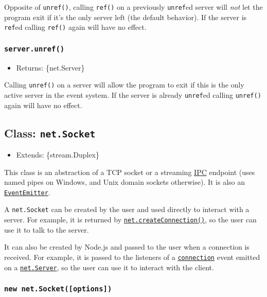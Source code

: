 Opposite of \texttt{unref()}, calling \texttt{ref()} on a previously
\texttt{unref}ed server will \emph{not} let the program exit if it's the
only server left (the default behavior). If the server is \texttt{ref}ed
calling \texttt{ref()} again will have no effect.

\subsubsection{\texorpdfstring{\texttt{server.unref()}}{server.unref()}}\label{server.unref}

\begin{itemize}
\tightlist
\item
  Returns: \{net.Server\}
\end{itemize}

Calling \texttt{unref()} on a server will allow the program to exit if
this is the only active server in the event system. If the server is
already \texttt{unref}ed calling \texttt{unref()} again will have no
effect.

\subsection{\texorpdfstring{Class:
\texttt{net.Socket}}{Class: net.Socket}}\label{class-net.socket}

\begin{itemize}
\tightlist
\item
  Extends: \{stream.Duplex\}
\end{itemize}

This class is an abstraction of a TCP socket or a streaming
\hyperref[ipc-support]{IPC} endpoint (uses named pipes on Windows, and
Unix domain sockets otherwise). It is also an
\href{events.md\#class-eventemitter}{\texttt{EventEmitter}}.

A \texttt{net.Socket} can be created by the user and used directly to
interact with a server. For example, it is returned by
\hyperref[netcreateconnection]{\texttt{net.createConnection()}}, so the
user can use it to talk to the server.

It can also be created by Node.js and passed to the user when a
connection is received. For example, it is passed to the listeners of a
\hyperref[event-connection]{\texttt{\textquotesingle{}connection\textquotesingle{}}}
event emitted on a \hyperref[class-netserver]{\texttt{net.Server}}, so
the user can use it to interact with the client.

\subsubsection{\texorpdfstring{\texttt{new\ net.Socket({[}options{]})}}{new net.Socket({[}options{]})}}\label{new-net.socketoptions}

